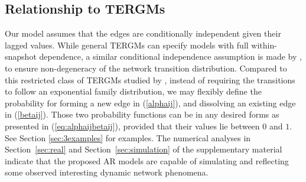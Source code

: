 \documentclass[12pt]{article}
\newcommand{\0}{{\bf 0}}
\begin{document}
\subsection{Relationship to  TERGMs}
\label{sec: relation2ERGM}
Our model assumes that the edges are conditionally independent given their lagged values. 
While general TERGMs can specify models with full within-snapshot dependence, a similar conditional independence assumption is made by \cite{hanneke2010}, to ensure non-degeneracy of the network transition distribution.
Compared to this restricted class of TERGMs studied by \cite{hanneke2010}, instead of requiring the transitions to follow an exponential family distribution, we may flexibly define the probability for forming a new edge in (\ref{alphaij}), and dissolving an existing edge in (\ref{betaij}). Those two probability functions can be in any desired forms as presented in (\ref{eq:alphaijbetaij}), provided that their values lie between $0$ and $1$.
See Section \ref{sec:3examples} for examples. The numerical analyses 
in Section~\ref{sec:real} and Section~\ref{sec:simulation} of the supplementary material indicate that the proposed AR models are capable of simulating and reflecting some observed interesting dynamic network phenomena.
\end{document}
